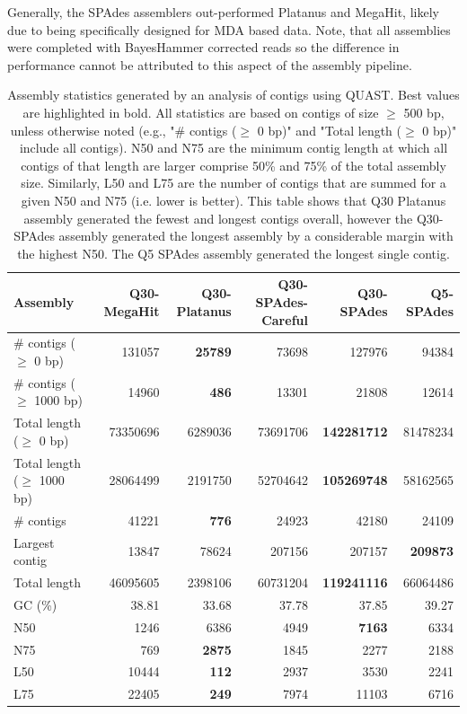 Generally, the SPAdes assemblers out-performed Platanus and MegaHit, likely due to 
being specifically designed for MDA based data.  Note, that all assemblies 
were completed with BayesHammer corrected reads so the difference in performance
cannot be attributed to this aspect of the assembly pipeline.

\begin{table}
\begin{tabular}{|l*{5}{|r}|}
\hline
Assembly & Q30-MegaHit & Q30-Platanus & Q30-SPAdes-Careful & Q30-SPAdes & Q5-SPAdes \\ \hline
\# contigs ($\geq$ 0 bp) & 131057 & {\bf 25789} & 73698 & 127976 & 94384 \\ \hline
\# contigs ($\geq$ 1000 bp) & 14960 & {\bf 486} & 13301 & 21808 & 12614 \\ \hline
Total length ($\geq$ 0 bp) & 73350696 & 6289036 & 73691706 & {\bf 142281712} & 81478234 \\ \hline
Total length ($\geq$ 1000 bp) & 28064499 & 2191750 & 52704642 & {\bf 105269748} & 58162565 \\ \hline
\# contigs & 41221 & {\bf 776} & 24923 & 42180 & 24109 \\ \hline
Largest contig & 13847 & 78624 & 207156 & 207157 & {\bf 209873} \\ \hline
Total length & 46095605 & 2398106 & 60731204 & {\bf 119241116} & 66064486 \\ \hline
GC (\%) & 38.81 & 33.68 & 37.78 & 37.85 & 39.27 \\ \hline
N50 & 1246 & 6386 & 4949 & {\bf 7163} & 6334 \\ \hline
N75 & 769 & {\bf 2875} & 1845 & 2277 & 2188 \\ \hline
L50 & 10444 & {\bf 112} & 2937 & 3530 & 2241 \\ \hline
L75 & 22405 & {\bf 249} & 7974 & 11103 & 6716 \\ \hline

\end{tabular}
\caption[Genome Assembly Statistics]{Assembly statistics generated by an analysis of contigs using QUAST. Best values are highlighted in bold.
All statistics are based on contigs of size $\geq$ 500 bp, unless otherwise noted (e.g., "\# contigs ($\geq$ 0 bp)" and "Total length ($\geq$ 0 bp)" include all contigs).
N50 and N75 are the minimum contig length at which all contigs of that length are larger comprise 50\% and 75\% of the total assembly size. Similarly, L50 and L75 
are the number of contigs that are summed for a given N50 and N75 (i.e. lower is better). 
This table shows that Q30 Platanus assembly generated the fewest and longest contigs overall, however the Q30-SPAdes assembly generated the longest
assembly by a considerable margin with the highest N50.  The Q5 SPAdes assembly generated the longest single contig.
}
\label{tab:genome_ass_comparison}
\end{table}

